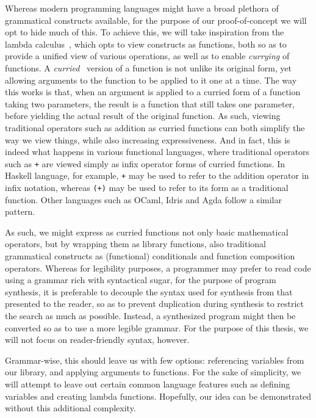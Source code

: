 \documentclass{article}
\begin{document}
Whereas modern programming languages might have a broad plethora of grammatical constructs available,
for the purpose of our proof-of-concept we will opt to hide much of this.
To achieve this, we will take inspiration from the lambda calculus~\citep{lambdacalculus},
which opts to view constructs as functions,
both so as to provide a unified view of various operations, as well as to enable \emph{currying} of functions.
A \emph{curried}~\citep{currying} version of a function is not unlike its original form,
yet allowing arguments to the function to be applied to it one at a time.
The way this works is that, when an argument is applied to a curried form of a function taking two parameters,
the result is a function that still takes one parameter, before yielding the actual result of the original function.
As such, viewing traditional operators such as addition as curried functions can both simplify the way we view things,
while also increasing expressiveness.
And in fact, this is indeed what happens in various functional languages,
where traditional operators such as \verb|+| are viewed simply as infix operator forms of curried functions.
In Haskell language, for example, \verb|+| may be used to refer to the addition operator in infix notation,
whereas \verb|(+)| may be used to refer to its form as a traditional function.
Other languages such as OCaml, Idris and Agda follow a similar pattern.

As such, we might express as curried functions not only basic mathematical operators,
but by wrapping them as library functions,
also traditional grammatical constructs as (functional) conditionals and function composition operators.
Whereas for legibility purposes, a programmer may prefer to read code using a grammar rich with syntactical sugar,
for the purpose of program synthesis,
it is preferable to decouple the syntax used for synthesis from that presented to the reader,
so as to prevent duplication during synthesis to restrict the search as much as possible.
Instead, a synthesized program might then be converted so as to use a more legible grammar.
For the purpose of this thesis, we will not focus on reader-friendly syntax, however.

Grammar-wise, this should leave us with few options:
referencing variables from our library,
and applying arguments to functions.
For the sake of simplicity,
we will attempt to leave out certain common language features such as defining variables and creating lambda functions.
Hopefully, our idea can be demonstrated without this additional complexity.
\end{document}
